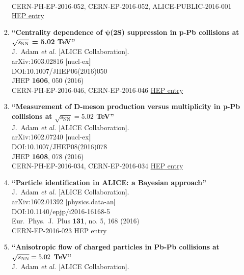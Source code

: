 \begin{enumerate}
  \\{}CERN-PH-EP-2016-052, CERN-EP-2016-052, ALICE-PUBLIC-2016-001
\href{http://inspirehep.net/record/1427026}{HEP entry}
\item%
{\bf ``Centrality dependence of $\mathbf{\psi}$(2S) suppression in p-Pb collisions at $\mathbf{\sqrt{{\textit s}_{\rm NN}}}$ = 5.02 TeV''}
  \\{}J.~Adam {\it et al.} [ALICE Collaboration].
  \\{}arXiv:1603.02816 [nucl-ex]
  \\{}DOI:10.1007/JHEP06(2016)050
  \\{}JHEP {\bf 1606}, 050 (2016)
  \\{}CERN-PH-EP-2016-046, CERN-EP-2016-046
\href{http://inspirehep.net/record/1426826}{HEP entry}
\item%
{\bf ``Measurement of D-meson production versus multiplicity in p-Pb collisions at $ \sqrt{{\mathrm{s}}_{\mathrm{NN}}}=5.02 $ TeV''}
  \\{}J.~Adam {\it et al.} [ALICE Collaboration].
  \\{}arXiv:1602.07240 [nucl-ex]
  \\{}DOI:10.1007/JHEP08(2016)078
  \\{}JHEP {\bf 1608}, 078 (2016)
  \\{}CERN-PH-EP-2016-034, CERN-EP-2016-034
\href{http://inspirehep.net/record/1423072}{HEP entry}
\item%
{\bf ``Particle identification in ALICE: a Bayesian approach''}
  \\{}J.~Adam {\it et al.} [ALICE Collaboration].
  \\{}arXiv:1602.01392 [physics.data-an]
  \\{}DOI:10.1140/epjp/i2016-16168-5
  \\{}Eur.\ Phys.\ J.\ Plus {\bf 131}, no. 5, 168 (2016)
  \\{}CERN-EP-2016-023
\href{http://inspirehep.net/record/1419249}{HEP entry}
\item%
{\bf ``Anisotropic flow of charged particles in Pb-Pb collisions at $\sqrt{s_{\rm NN}}=5.02$ TeV''}
  \\{}J.~Adam {\it et al.} [ALICE Collaboration].

\end{enumerate}
